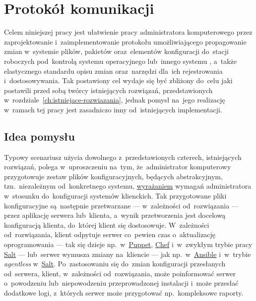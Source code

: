 \documentclass[thesis]{subfiles}
\begin{document}
\chapter{Protokół komunikacji}
\label{ch:protokol}

Celem niniejszej pracy jest ułatwienie pracy administratora komputerowego przez zaprojektowanie i~zaimplementowanie protokołu umożliwiającego propagowanie zmian w~systemie plików, pakietów oraz~elementów konfiguracji do~stacji roboczych pod~kontrolą systemu operacyjnego  lub~innego systemu , a~także elastycznego standardu opisu zmian oraz~narzędzi dla~ich rejestrowania i~dostosowywania. Tak postawiony cel wydaje się być zbliżony do~celu jaki postawili przed sobą twórcy istniejących rozwiązań, przedstawionych w~rozdziale~\ref{ch:istniejace-rozwiazania}, jednak pomysł na~jego realizację w~ramach tej pracy jest zasadniczo inny od~istniejących implementacji.


\section{Idea pomysłu}

Typowy scenariusz użycia dowolnego z~przedstawionych czterech, istniejących rozwiązań, polega w~uproszczeniu na~tym, że~administrator komputerowy przygotowuje zestaw plików konfiguracyjnych, będących abstrakcyjnym, tzn.~niezależnym od~konkretnego systemu, \href{https://martinfowler.com/bliki/DomainSpecificLanguage.html}{wyrażaniem} wymagań administratora w~stosunku do~konfiguracji systemów klienckich. Tak przygotowane pliki konfiguracyjne są~następnie przetwarzane --- w~zależności od~rozwiązania --- przez aplikację serwera lub~klienta, a~wynik przetworzenia jest docelową konfiguracją klienta, do~której klient się dostosowuje. W~zależności od~rozwiązania, klient odpytuje serwer co~pewien czas o~aktualizację oprogramowania --- tak się dzieje np.~w~\hyperref[sec:puppet]{Puppet}, \hyperref[sec:chef]{Chef} i~w~zwykłym trybie pracy \hyperref[sec:salt]{Salt} --- lub~serwer wymusza zmiany na~kliencie --- jak np.~w~\hyperref[sec:ansible]{Ansible} i~w~trybie \emph{agentless} w~\hyperref[sec:salt]{Salt}. Po~zastosowaniu się do~zmian konfiguracji przesłanych od~serwera, klient, w~zależności od~rozwiązania, może poinformować serwer o~powodzeniu lub~niepowodzeniu przeprowadzonej instalacji i~może przesłać dodatkowe logi, z~których serwer może przygotować np.~kompleksowe raporty.
\end{document}
